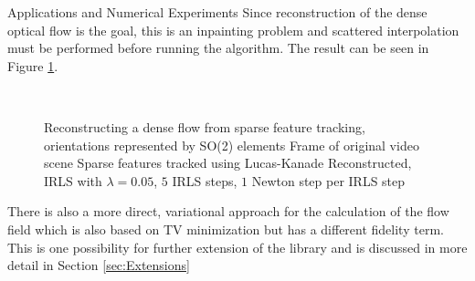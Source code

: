 \begin{chapter}{Applications and Numerical Experiments}
Since reconstruction of the dense optical flow is the goal, this is an inpainting problem and scattered interpolation must be performed before running the algorithm. The result can be seen in 
Figure \ref{fig:application_flowfield1}.
\begin{figure}[h!]
    \centering
    \\
    \caption[Dense optical flow reconstruction]{Reconstructing a dense flow from sparse feature tracking, orientations represented by SO(2) elements
	 Frame of original video scene 
	 Sparse features tracked using Lucas-Kanade
	 Reconstructed, IRLS with $\lambda=0.05$, $5$ IRLS steps, $1$ Newton step per IRLS step
	\label{fig:application_flowfield1}
    }
\end{figure}

There is also a more direct, variational approach for the calculation of the flow field
which is also based on TV minimization but has a different fidelity term. This is one possibility for further extension of the library and is discussed in more detail in 
Section \ref{sec:Extensions}


\end{chapter}
